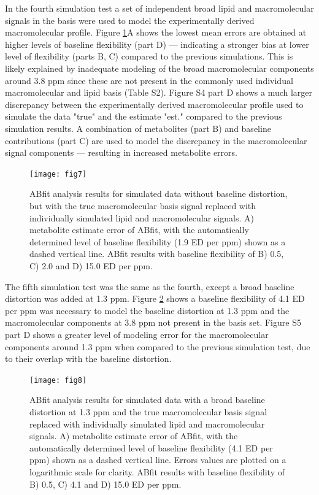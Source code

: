 \documentclass[num-refs]{wiley-article}
\begin{document}
In the fourth simulation test a set of independent broad lipid and macromolecular signals in the basis were used to model the experimentally derived macromolecular profile. Figure \ref{sim_lip_mm_basis}A shows the lowest mean errors are obtained at higher levels of baseline flexibility (part D) --- indicating a stronger bias at lower level of flexibility (parts B, C) compared to the previous simulations. This is likely explained by inadequate modeling of the broad macromolecular components around 3.8 ppm since these are not present in the commonly used individual macromolecular and lipid basis (Table S2). Figure S4 part D shows a much larger discrepancy between the experimentally derived macromolecular profile used to simulate the data "true" and the estimate "est." compared to the previous simulation results. A combination of metabolites (part B) and baseline contributions (part C) are used to model the discrepancy in the macromolecular signal components --- resulting in increased metabolite errors.

\begin{figure}
  \begin{center}
    \texttt{[image: fig7]}
    \caption{ABfit analysis results for simulated data without baseline distortion, but with the true macromolecular basis signal replaced with individually simulated lipid and macromolecular signals. A) metabolite estimate error of ABfit, with the automatically determined level of baseline flexibility (1.9 ED per ppm) shown as a dashed vertical line. ABfit results with baseline flexibility of B) 0.5, C) 2.0 and D) 15.0 ED per ppm.}
    \label{sim_lip_mm_basis}
  \end{center}
\end{figure}

The fifth simulation test was the same as the fourth, except a broad baseline distortion was added at 1.3 ppm. Figure \ref{sim_lip_mm_basis_broad_bl} shows a baseline flexibility of 4.1 ED per ppm was necessary to model the baseline distortion at 1.3 ppm and the macromolecular components at 3.8 ppm not present in the basis set. Figure S5 part D shows a greater level of modeling error for the macromolecular components around 1.3 ppm when compared to the previous simulation test, due to their overlap with the baseline distortion.

\begin{figure}
  \begin{center}
    \texttt{[image: fig8]}
    \caption{ABfit analysis results for simulated data with a broad baseline distortion at 1.3 ppm and the true macromolecular basis signal replaced with individually simulated lipid and macromolecular signals. A) metabolite estimate error of ABfit, with the automatically determined level of baseline flexibility (4.1 ED per ppm) shown as a dashed vertical line. Errors values are plotted on a logarithmic scale for clarity. ABfit results with baseline flexibility of B) 0.5, C) 4.1 and D) 15.0 ED per ppm.}
    \label{sim_lip_mm_basis_broad_bl}
  \end{center}
\end{figure}
\end{document}
